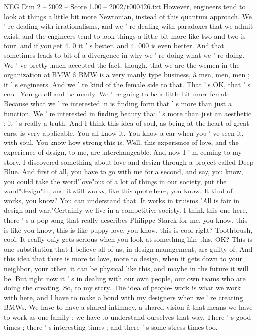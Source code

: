 \begin{textsample}{NEG Dim 2 – 2002 – Score 1.00 – 2002/t000426.txt}
However, engineers tend to look at things a little bit more Newtonian, instead of this quantum approach.
We ' re dealing with irrationalisms, and we ' re dealing with paradoxes that we admit exist, and the engineers tend to look things a little bit more like two and two is four, and if you get 4. 0 it ' s better, and 4. 000 is even better.
And that sometimes leads to bit of a divergence in why we ' re doing what we ' re doing.
We ' ve pretty much accepted the fact, though, that we are the women in the organization at BMW â BMW is a very manly type business, â men, men, men ; it ' s engineers.
And we ' re kind of the female side to that.
That ' s OK, that ' s cool.
You go off and be manly.
We ' re going to be a little bit more female.
Because what we ' re interested in is finding form that ' s more than just a function.
We ' re interested in finding beauty that ' s more than just an aesthetic ; it ' s really a truth.
And I think this idea of soul, as being at the heart of great cars, is very applicable.
You all know it.
You know a car when you ' ve seen it, with soul.
You know how strong this is.
Well, this experience of love, and the experience of design, to me, are interchangeable.
And now I ' m coming to my story.
I discovered something about love and design through a project called Deep Blue.
And first of all, you have to go with me for a second, and say, you know, you could take the word"love"out of a lot of things in our society, put the word"design"in, and it still works, like this quote here, you know.
It kind of works, you know?
You can understand that.
It works in truisms."All is fair in design and war."Certainly we live in a competitive society.
I think this one here, there ' s a pop song that really describes Philippe Starck for me, you know, this is like you know, this is like puppy love, you know, this is cool right?
Toothbrush, cool.
It really only gets serious when you look at something like this.
OK?
This is one substitution that I believe all of us, in design management, are guilty of.
And this idea that there is more to love, more to design, when it gets down to your neighbor, your other, it can be physical like this, and maybe in the future it will be.
But right now it ' s in dealing with our own people, our own teams who are doing the creating.
So, to my story.
The idea of people- work is what we work with here, and I have to make a bond with my designers when we ' re creating BMWs.
We have to have a shared intimacy, a shared vision â that means we have to work as one family ; we have to understand ourselves that way.
There ' s good times ; there ' s interesting times ; and there ' s some stress times too.

\end{textsample}
